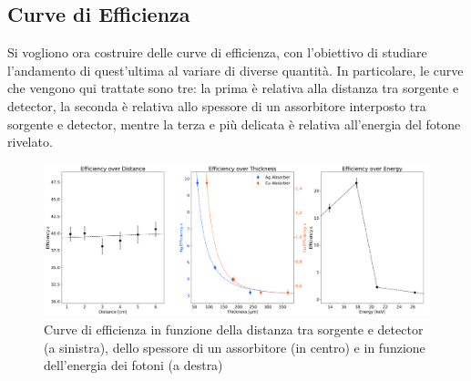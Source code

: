 \documentclass[twocolumn,10pt]{asme2ej}
\begin{document}
\subsection{Curve di Efficienza}

Si vogliono ora costruire delle curve di efficienza, con l'obiettivo di studiare l'andamento di quest'ultima al variare
di diverse quantità. In particolare, le curve che vengono qui trattate sono tre: la prima è relativa alla distanza tra
sorgente e detector, la seconda è relativa allo spessore di un assorbitore interposto tra sorgente e detector, mentre la
terza e più delicata è relativa all'energia del fotone rivelato. \\

\begin{figure}[t]
    \centering
    \includegraphics[width=\textwidth]{../Plots/efficiency.png}
   \caption{Curve di efficienza in funzione della distanza tra sorgente e detector (a sinistra), dello spessore di un
            assorbitore (in centro) e in funzione dell'energia dei fotoni (a destra)}
    \label{i:efficiency}
\end{figure}
\end{document}
